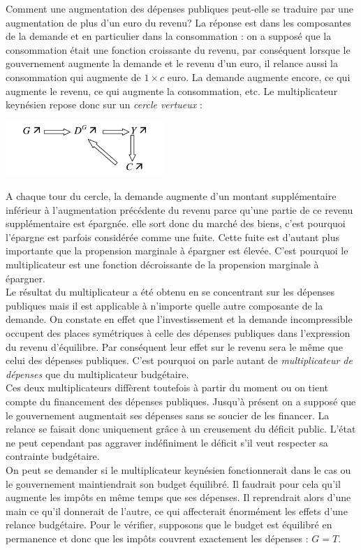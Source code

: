 \documentclass[10pt]{book}
\begin{document}
Comment une augmentation des dépenses publiques peut-elle se traduire par une augmentation de plus d'un euro du revenu? La réponse est dans les composantes de la demande et en particulier dans la consommation : on a supposé que la consommation était une fonction croissante du revenu, par conséquent lorsque le gouvernement augmente la demande et le revenu d'un euro, il relance aussi la consommation qui augmente de $1 \times c$ euro. La demande augmente encore, ce qui augmente le revenu, ce qui augmente la consommation, etc. Le multiplicateur keynésien repose donc sur un \textit{cercle vertueux} :
\begin{center}
  \includegraphics[width=6cm]{graph16.png}
\end{center}
A chaque tour du cercle, la demande augmente d'un montant supplémentaire inférieur à l'augmentation précédente du revenu parce qu'une partie de ce revenu supplémentaire est épargnée. elle sort donc du marché des biens, c'est pourquoi l'épargne est parfois considérée comme une fuite. Cette fuite est d'autant plus importante que la propension marginale à épargner est élevée. C'est pourquoi le multiplicateur est une fonction décroissante de la propension marginale à épargner. \\
Le résultat du multiplicateur a été obtenu en se concentrant sur les dépenses publiques mais il est applicable à n'importe quelle autre composante de la demande. On constate en effet que l'investissement et la demande incompressible occupent des places symétriques à celle des dépenses publiques dans l'expression du revenu d'équilibre. Par conséquent leur effet sur le revenu sera le même que celui des dépenses publiques. C'est pourquoi on parle autant de \textit{multiplicateur de dépenses} que du multiplicateur budgétaire. \\
Ces deux multiplicateurs diffèrent toutefois à partir du moment ou on tient compte du financement des dépenses publiques. Jusqu'à présent on a supposé que le gouvernement augmentait ses dépenses sans se soucier de les financer. La relance se faisait donc uniquement grâce à un creusement du déficit public. L'état ne peut cependant pas aggraver indéfiniment le déficit s'il veut respecter sa contrainte budgétaire. \\
On peut se demander si le multiplicateur keynésien fonctionnerait dans le cas ou le gouvernement maintiendrait son budget équilibré. Il faudrait pour cela qu'il augmente les impôts en même temps que ses dépenses. Il reprendrait alors d'une main ce qu'il donnerait de l'autre, ce qui affecterait énormément les effets d'une relance budgétaire. Pour le vérifier, supposons que le budget est équilibré en permanence et donc que les impôts couvrent exactement les dépenses : $G = T$. \\
\end{document}
